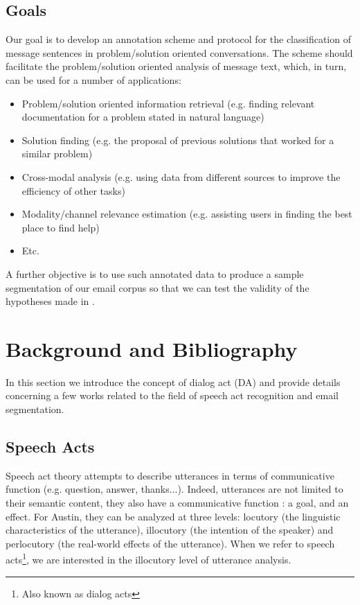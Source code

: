\documentclass[11pt]{article}
\begin{document}
\subsection{Goals}

Our goal is to develop an annotation scheme and protocol for the classification of message sentences in problem/solution oriented conversations. The scheme should facilitate the problem/solution oriented analysis of message text, which, in turn, can be used for a number of applications:

\begin{itemize}
	\item Problem/solution oriented information retrieval (e.g. finding relevant documentation for a problem stated in natural language)
	\item Solution finding (e.g. the proposal of previous solutions that worked for a similar problem)
	\item Cross-modal analysis (e.g. using data from different sources to improve the efficiency of other tasks)
	\item Modality/channel relevance estimation (e.g. assisting users in finding the best place to find help)
	\item Etc.
\end{itemize}

A further objective is to use such annotated data to produce a sample segmentation of our email corpus so that we can test the validity of the hypotheses made in \cite{hernandez2014exploiting}.

\section{Background and Bibliography}

In this section we introduce the concept of dialog act (DA) and provide details concerning a few works related to the field of speech act recognition and email segmentation.

\subsection{Speech Acts}

Speech act theory \cite{austin1975things} attempts to describe utterances in terms of communicative function (e.g. question, answer, thanks...). Indeed, utterances are not limited to their semantic content, they also have a communicative function : a goal, and an effect. For Austin, they can be analyzed at three levels: locutory (the linguistic characteristics of the utterance), illocutory (the intention of the speaker) and perlocutory (the real-world effects of the utterance). When we refer to speech acts\footnote{Also known as dialog acts}, we are interested in the illocutory level of utterance analysis. 
\end{document}
